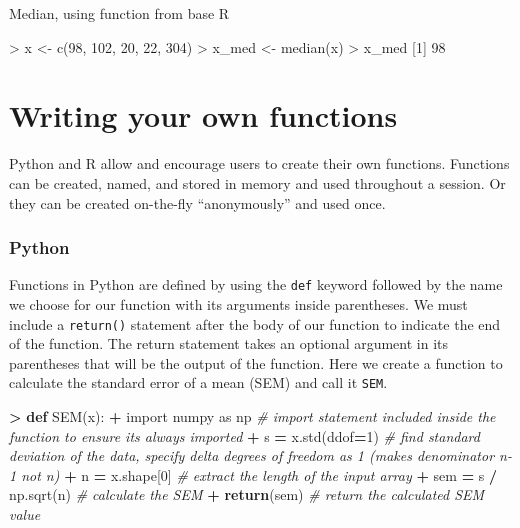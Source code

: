 \documentclass[
]{book}
\newenvironment{Shaded}{\begin{snugshade}}{\end{snugshade}}
\newcommand{\CommentTok}[1]{\textcolor[rgb]{0.56,0.35,0.01}{\textit{#1}}}
\newcommand{\ControlFlowTok}[1]{\textcolor[rgb]{0.13,0.29,0.53}{\textbf{#1}}}
\newcommand{\DecValTok}[1]{\textcolor[rgb]{0.00,0.00,0.81}{#1}}
\newcommand{\FunctionTok}[1]{\textcolor[rgb]{0.00,0.00,0.00}{#1}}
\newcommand{\ImportTok}[1]{#1}
\newcommand{\KeywordTok}[1]{\textcolor[rgb]{0.13,0.29,0.53}{\textbf{#1}}}
\newcommand{\NormalTok}[1]{#1}
\newcommand{\OperatorTok}[1]{\textcolor[rgb]{0.81,0.36,0.00}{\textbf{#1}}}
\newcommand{\OtherTok}[1]{\textcolor[rgb]{0.56,0.35,0.01}{#1}}
\newcommand{\SpecialCharTok}[1]{\textcolor[rgb]{0.00,0.00,0.00}{#1}}
\begin{document}
Median, using function from base R

\begin{Shaded}
\begin{Highlighting}[]
\SpecialCharTok{\textgreater{}}\NormalTok{ x }\OtherTok{\textless{}{-}} \FunctionTok{c}\NormalTok{(}\DecValTok{98}\NormalTok{, }\DecValTok{102}\NormalTok{, }\DecValTok{20}\NormalTok{, }\DecValTok{22}\NormalTok{, }\DecValTok{304}\NormalTok{)}
\SpecialCharTok{\textgreater{}}\NormalTok{ x\_med }\OtherTok{\textless{}{-}} \FunctionTok{median}\NormalTok{(x)}
\SpecialCharTok{\textgreater{}}\NormalTok{ x\_med}
\NormalTok{[}\DecValTok{1}\NormalTok{] }\DecValTok{98}
\end{Highlighting}
\end{Shaded}

\hypertarget{writing-your-own-functions}{%
\section{Writing your own functions}\label{writing-your-own-functions}}

Python and R allow and encourage users to create their own functions. Functions can be created, named, and stored in memory and used throughout a session. Or they can be created on-the-fly ``anonymously'' and used once.

\hypertarget{python-7}{%
\subsubsection*{Python}\label{python-7}}

Functions in Python are defined by using the \texttt{def} keyword followed by the name we choose for our function with its arguments inside parentheses. We must include a \texttt{return()} statement after the body of our function to indicate the end of the function. The return statement takes an optional argument in its parentheses that will be the output of the function. Here we create a function to calculate the standard error of a mean (SEM) and call it \texttt{SEM}.

\begin{Shaded}
\begin{Highlighting}[]
\OperatorTok{\textgreater{}} \KeywordTok{def}\NormalTok{ SEM(x):}
\OperatorTok{+}   \ImportTok{import}\NormalTok{ numpy }\ImportTok{as}\NormalTok{ np }\CommentTok{\# import statement included inside the function to ensure it\textquotesingle{}s always imported}
\OperatorTok{+}\NormalTok{   s }\OperatorTok{=}\NormalTok{ x.std(ddof}\OperatorTok{=}\DecValTok{1}\NormalTok{) }\CommentTok{\# find standard deviation of the data, specify delta degrees of freedom as 1 (makes denominator n{-}1 not n)}
\OperatorTok{+}\NormalTok{   n }\OperatorTok{=}\NormalTok{ x.shape[}\DecValTok{0}\NormalTok{] }\CommentTok{\# extract the length of the input array}
\OperatorTok{+}\NormalTok{   sem }\OperatorTok{=}\NormalTok{ s }\OperatorTok{/}\NormalTok{ np.sqrt(n) }\CommentTok{\# calculate the SEM}
\OperatorTok{+}   \ControlFlowTok{return}\NormalTok{(sem) }\CommentTok{\# return the calculated SEM value}
\end{Highlighting}
\end{Shaded}
\end{document}
